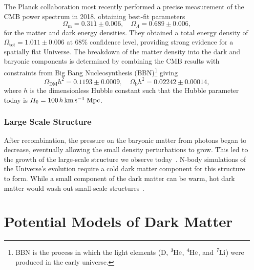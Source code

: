 The Planck collaboration most recently performed a precise measurement of the CMB power spectrum in 2018, obtaining best-fit parameters~\cite{Planck:2018vyg_sep_Planck2018results,Planck:2019nip_sep_Planck2018results}
\begin{equation}
     \Omega_\mathrm{m} = 0.311 \pm 0.006,\quad \Omega_\Lambda = 0.689 \pm 0.006,
\end{equation}
for the matter and dark energy densities. They obtained a total energy density of $\Omega_\mathrm{tot} = 1.011 \pm 0.006$ at $68\%$ confidence level, providing strong evidence for a spatially flat Universe. 
The breakdown of the matter density into the dark and baryonic components is determined by combining the CMB results with constraints from Big Bang Nucleosynthesis (BBN)\footnote{BBN is the process in which the light elements (D, $\ce{^3 He}$, $\ce{^4 He}$, and $\ce{^7 Li}$) were produced in the early universe.} giving
\begin{equation}
    \Omega_\mathrm{DM}h^2 = 0.1193 \pm 0.0009,\quad \Omega_\mathrm{b}h^2 = 0.02242 \pm 0.00014,
\end{equation}
where $h$ is the dimensionless Hubble constant such that the Hubble parameter today is $H_0 = 100\, h{\rm \,km}{\rm \,s}^{-1}\;\mathrm{Mpc}$. 



\subsubsection*{Large Scale Structure}
After recombination, the pressure on the baryonic matter from photons began to decrease, eventually allowing the small density perturbations to grow. This led to the growth of the large-scale structure we observe today~\cite{Springel:2006vs_LargescalestructureUniverse}. N-body simulations of the Universe's evolution require a cold dark matter component for this structure to form. While a small component of the dark matter can be warm, hot dark matter would wash out small-scale structures~\cite{Springel:2005nw_Simulatingjointevolution}.  

\section{Potential Models of Dark Matter}
\label{ch1:sec:DM_models}

